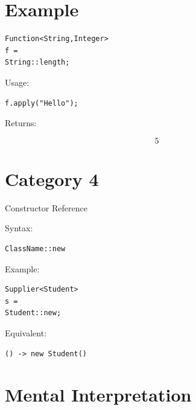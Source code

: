 \documentclass[11pt,a4paper]{book}
\begin{document}

\section{Example}

\begin{verbatim} 
Function<String,Integer>
f =
String::length;
\end{verbatim}


Usage:

\begin{verbatim} 
f.apply("Hello");
\end{verbatim}


Returns:

\[
5
\]


\section{Category 4}

Constructor Reference


Syntax:

\begin{verbatim} 
ClassName::new
\end{verbatim}


Example:

\begin{verbatim} 
Supplier<Student>
s =
Student::new;
\end{verbatim}


Equivalent:

\begin{verbatim} 
() -> new Student()
\end{verbatim}


\section{Mental Interpretation}
\end{document}

